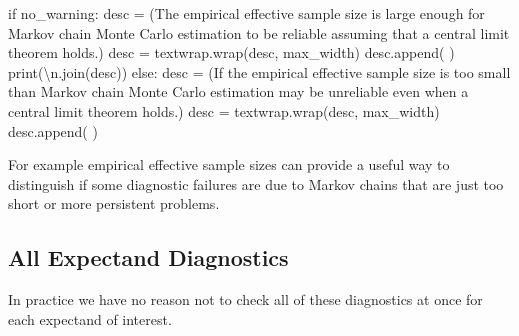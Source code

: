 \documentclass[
  letterpaper,
  DIV=11,
  numbers=noendperiod]{scrartcl}
\newenvironment{Shaded}{\begin{snugshade}}{\end{snugshade}}
\newcommand{\BuiltInTok}[1]{\textcolor[rgb]{0.00,0.23,0.31}{#1}}
\newcommand{\CharTok}[1]{\textcolor[rgb]{0.13,0.47,0.30}{#1}}
\newcommand{\ControlFlowTok}[1]{\textcolor[rgb]{0.00,0.23,0.31}{#1}}
\newcommand{\NormalTok}[1]{\textcolor[rgb]{0.00,0.23,0.31}{#1}}
\newcommand{\OperatorTok}[1]{\textcolor[rgb]{0.37,0.37,0.37}{#1}}
\newcommand{\StringTok}[1]{\textcolor[rgb]{0.13,0.47,0.30}{#1}}
\begin{document}
\begin{Shaded}
\begin{Highlighting}[]
  \ControlFlowTok{if}\NormalTok{ no\_warning:}
\NormalTok{    desc }\OperatorTok{=}\NormalTok{ (}\StringTok{\textquotesingle{}The empirical effective sample size is large enough for \textquotesingle{}}
            \StringTok{\textquotesingle{}Markov chain Monte Carlo estimation to be reliable \textquotesingle{}}
            \StringTok{\textquotesingle{}assuming that a central limit theorem holds.\textquotesingle{}}\NormalTok{)}
\NormalTok{    desc }\OperatorTok{=}\NormalTok{ textwrap.wrap(desc, max\_width)}
\NormalTok{    desc.append(}\StringTok{\textquotesingle{} \textquotesingle{}}\NormalTok{)}
    \BuiltInTok{print}\NormalTok{(}\StringTok{\textquotesingle{}}\CharTok{\textbackslash{}n}\StringTok{\textquotesingle{}}\NormalTok{.join(desc))}
  \ControlFlowTok{else}\NormalTok{:}
\NormalTok{    desc }\OperatorTok{=}\NormalTok{ (}\StringTok{\textquotesingle{}If the empirical effective sample size is too small than \textquotesingle{}}
            \StringTok{\textquotesingle{}Markov chain Monte Carlo estimation may be unreliable \textquotesingle{}}
            \StringTok{\textquotesingle{}even when a central limit theorem holds.\textquotesingle{}}\NormalTok{)}
\NormalTok{    desc }\OperatorTok{=}\NormalTok{ textwrap.wrap(desc, max\_width)}
\NormalTok{    desc.append(}\StringTok{\textquotesingle{} \textquotesingle{}}\NormalTok{)}
\end{Highlighting}
\end{Shaded}

For example empirical effective sample sizes can provide a useful way to
distinguish if some diagnostic failures are due to Markov chains that
are just too short or more persistent problems.

\hypertarget{all-expectand-diagnostics}{%
\subsection{All Expectand Diagnostics}\label{all-expectand-diagnostics}}

In practice we have no reason not to check all of these diagnostics at
once for each expectand of interest.
\end{document}
